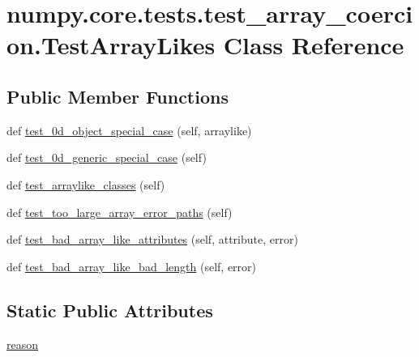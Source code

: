 \hypertarget{classnumpy_1_1core_1_1tests_1_1test__array__coercion_1_1TestArrayLikes}{}\section{numpy.\+core.\+tests.\+test\+\_\+array\+\_\+coercion.\+Test\+Array\+Likes Class Reference}
\label{classnumpy_1_1core_1_1tests_1_1test__array__coercion_1_1TestArrayLikes}
\subsection*{Public Member Functions}
\begin{DoxyCompactItemize}
\item 
def \hyperlink{classnumpy_1_1core_1_1tests_1_1test__array__coercion_1_1TestArrayLikes_a32d13b09c35338168eb6b3159d27c6cc}{test\+\_\+0d\+\_\+object\+\_\+special\+\_\+case} (self, arraylike)
\item 
def \hyperlink{classnumpy_1_1core_1_1tests_1_1test__array__coercion_1_1TestArrayLikes_a10b85341e20937f58bed04aeeea12220}{test\+\_\+0d\+\_\+generic\+\_\+special\+\_\+case} (self)
\item 
def \hyperlink{classnumpy_1_1core_1_1tests_1_1test__array__coercion_1_1TestArrayLikes_a3e9180057f823f570f2eccbcd7d4214d}{test\+\_\+arraylike\+\_\+classes} (self)
\item 
def \hyperlink{classnumpy_1_1core_1_1tests_1_1test__array__coercion_1_1TestArrayLikes_a4b7a95da4fab626259ecc64568d25d17}{test\+\_\+too\+\_\+large\+\_\+array\+\_\+error\+\_\+paths} (self)
\item 
def \hyperlink{classnumpy_1_1core_1_1tests_1_1test__array__coercion_1_1TestArrayLikes_a4af5163c58c1595a5a645a5b47fcd92b}{test\+\_\+bad\+\_\+array\+\_\+like\+\_\+attributes} (self, attribute, error)
\item 
def \hyperlink{classnumpy_1_1core_1_1tests_1_1test__array__coercion_1_1TestArrayLikes_a9d6ad7fa487384d3753e3e129648c548}{test\+\_\+bad\+\_\+array\+\_\+like\+\_\+bad\+\_\+length} (self, error)
\end{DoxyCompactItemize}
\subsection*{Static Public Attributes}
\begin{DoxyCompactItemize}
\item 
\hyperlink{classnumpy_1_1core_1_1tests_1_1test__array__coercion_1_1TestArrayLikes_a2d2e4efce21d64e25709ad22d48c0a24}{reason}
\end{DoxyCompactItemize}


